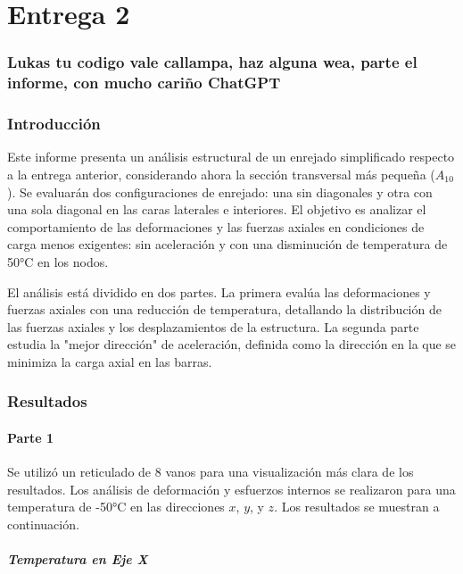 \part{Entrega 2}

\newpage
\section{Lukas tu codigo vale callampa, haz alguna wea, parte el informe, con mucho cariño ChatGPT}

\newpage
\section{Introducción}

Este informe presenta un análisis estructural de un enrejado simplificado respecto a la entrega anterior, considerando ahora la sección transversal más pequeña (\(A_{10}\)). Se evaluarán dos configuraciones de enrejado: una sin diagonales y otra con una sola diagonal en las caras laterales e interiores. El objetivo es analizar el comportamiento de las deformaciones y las fuerzas axiales en condiciones de carga menos exigentes: sin aceleración y con una disminución de temperatura de 50°C en los nodos.

El análisis está dividido en dos partes. La primera evalúa las deformaciones y fuerzas axiales con una reducción de temperatura, detallando la distribución de las fuerzas axiales y los desplazamientos de la estructura. La segunda parte estudia la "mejor dirección" de aceleración, definida como la dirección en la que se minimiza la carga axial en las barras.

\section{Resultados}

\subsection{Parte 1}

Se utilizó un reticulado de 8 vanos para una visualización más clara de los resultados. Los análisis de deformación y esfuerzos internos se realizaron para una temperatura de -50°C en las direcciones $x$, $y$, y $z$. Los resultados se muestran a continuación.

\subsubsection{Temperatura en Eje X}

